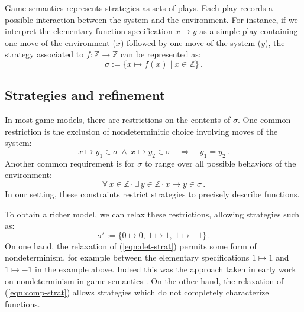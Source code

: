 \documentclass[draft,11pt]{report}
\theoremstyle{definition}
\newcommand{\bdot}{\boldsymbol{\cdot}}
\begin{document}
Game semantics represents strategies as sets of plays.
Each play records a possible interaction between
the system and the environment.
For instance,
if we interpret the elementary function specification
$x \mapsto y$
as a simple play
containing one move of the environment ($x$)
followed by one move of the system ($y$),
the strategy associated to $f : \mathbb{Z} \rightarrow \mathbb{Z}$
can be represented as:
\[
  \sigma := \{ x \mapsto f(x) \mid x \in \mathbb{Z} \}
  \,.
\]

\subsection{Strategies and refinement} %

In most game models,
there are restrictions on the contents of $\sigma$.
One common restriction is
the exclusion of nondeterminitic choice
involving moves of the system:
\begin{equation}
  x \mapsto y_1 \in \sigma \: \wedge \: x \mapsto y_2 \in \sigma
  \quad \Rightarrow \quad
  y_1 = y_2
  \,.
  \label{eqn:det-strat}
\end{equation}
Another common requirement is
for $\sigma$ to range over all possible behaviors of the environment:
\begin{equation}
  \forall \, x \in \mathbb{Z} \, \bdot \,
  \exists \, y \in \mathbb{Z} \, \bdot \,
  x \mapsto y \in \sigma
  \,.
  \label{eqn:comp-strat}
\end{equation}
In our setting,
these constraints restrict strategies to
precisely describe functions.

To obtain a richer model,
we can relax these restrictions,
allowing strategies such as:
\[
  \sigma' :=
  \{ 0 \mapsto 0, \: 1 \mapsto 1 , \: 1 \mapsto -1 \}
  \,.
\]
On one hand,
the relaxation of (\ref{eqn:det-strat})
permits some form of nondeterminism,
for example between the elementary specifications
$1 \mapsto 1$ and $1 \mapsto -1$
in the example above.
Indeed this was the approach taken in early work
on nondeterminism in game semantics \citep{gsfnd}.
On the other hand,
the relaxation of (\ref{eqn:comp-strat})
allows strategies which do not completely characterize
functions.
\end{document}
